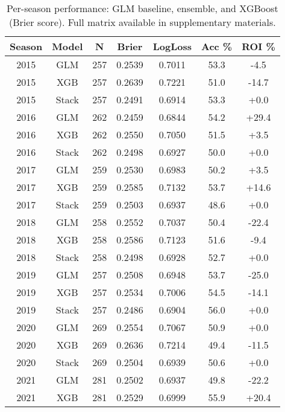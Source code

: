 \begin{table}[t]
  \centering
  \footnotesize
  \caption[Per-season performance (top 3 models)]{Per-season performance: GLM baseline, ensemble, and XGBoost (Brier score). Full matrix available in supplementary materials.}
  \label{tab:per-season-top3}
  \setlength{\tabcolsep}{2.5pt}\renewcommand{\arraystretch}{1.08}
  \begin{tabular}{@{} c c c c c c c @{} }
    \toprule
    \textbf{Season}  & \textbf{Model}  & \textbf{N}  & \textbf{Brier}  & \textbf{LogLoss}  & \textbf{Acc \%}  & \textbf{ROI \%} \\
    \midrule
    2015 & GLM & 257 & 0.2539 & 0.7011 & 53.3 & -4.5 \\
    2015 & XGB & 257 & 0.2639 & 0.7221 & 51.0 & -14.7 \\
    2015 & Stack & 257 & 0.2491 & 0.6914 & 53.3 & +0.0 \\
    \midrule
    2016 & GLM & 262 & 0.2459 & 0.6844 & 54.2 & +29.4 \\
    2016 & XGB & 262 & 0.2550 & 0.7050 & 51.5 & +3.5 \\
    2016 & Stack & 262 & 0.2498 & 0.6927 & 50.0 & +0.0 \\
    \midrule
    2017 & GLM & 259 & 0.2530 & 0.6983 & 50.2 & +3.5 \\
    2017 & XGB & 259 & 0.2585 & 0.7132 & 53.7 & +14.6 \\
    2017 & Stack & 259 & 0.2503 & 0.6937 & 48.6 & +0.0 \\
    \midrule
    2018 & GLM & 258 & 0.2552 & 0.7037 & 50.4 & -22.4 \\
    2018 & XGB & 258 & 0.2586 & 0.7123 & 51.6 & -9.4 \\
    2018 & Stack & 258 & 0.2498 & 0.6928 & 52.7 & +0.0 \\
    \midrule
    2019 & GLM & 257 & 0.2508 & 0.6948 & 53.7 & -25.0 \\
    2019 & XGB & 257 & 0.2534 & 0.7006 & 54.5 & -14.1 \\
    2019 & Stack & 257 & 0.2486 & 0.6904 & 56.0 & +0.0 \\
    \midrule
    2020 & GLM & 269 & 0.2554 & 0.7067 & 50.9 & +0.0 \\
    2020 & XGB & 269 & 0.2636 & 0.7214 & 49.4 & -11.5 \\
    2020 & Stack & 269 & 0.2504 & 0.6939 & 50.6 & +0.0 \\
    \midrule
    2021 & GLM & 281 & 0.2502 & 0.6937 & 49.8 & -22.2 \\
    2021 & XGB & 281 & 0.2529 & 0.6999 & 55.9 & +20.4 \\

\end{tabular}
\end{table}
